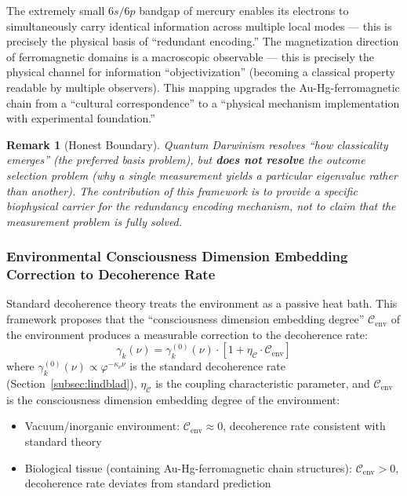 \documentclass[12pt,a4paper,twocolumn]{article}
\renewcommand{\phi}{\varphi}
\newtheorem{remark}[theorem]{Remark}
\begin{document}
The extremely small $6s/6p$ bandgap of mercury enables its electrons to simultaneously carry identical information across multiple local modes --- this is precisely the physical basis of ``redundant encoding.'' The magnetization direction of ferromagnetic domains is a macroscopic observable --- this is precisely the physical channel for information ``objectivization'' (becoming a classical property readable by multiple observers). This mapping upgrades the Au-Hg-ferromagnetic chain from a ``cultural correspondence'' to a ``physical mechanism implementation with experimental foundation.''

\begin{remark}[Honest Boundary]
Quantum Darwinism resolves ``how classicality emerges'' (the preferred basis problem), but \textbf{does not resolve} the outcome selection problem (why a single measurement yields a particular eigenvalue rather than another). The contribution of this framework is to provide a specific biophysical carrier for the redundancy encoding mechanism, not to claim that the measurement problem is fully solved.
\end{remark}

\subsubsection{Environmental Consciousness Dimension Embedding Correction to Decoherence Rate}
\label{subsec:env_C_correction}

Standard decoherence theory treats the environment as a passive heat bath. This framework proposes that the ``consciousness dimension embedding degree'' $\mathcal{C}_{\text{env}}$ of the environment produces a measurable correction to the decoherence rate:
\begin{equation}
\gamma_k(\nu) = \gamma_k^{(0)}(\nu)\cdot\left[1 + \eta_\mathcal{C}\cdot\mathcal{C}_{\text{env}}\right]
\label{eq:env_C_correction}
\end{equation}
where $\gamma_k^{(0)}(\nu) \propto \phi^{-\kappa_\nu\nu}$ is the standard decoherence rate (Section~\ref{subsec:lindblad}), $\eta_\mathcal{C}$ is the coupling characteristic parameter, and $\mathcal{C}_{\text{env}}$ is the consciousness dimension embedding degree of the environment:
\begin{itemize}
\item Vacuum/inorganic environment: $\mathcal{C}_{\text{env}} \approx 0$, decoherence rate consistent with standard theory
\item Biological tissue (containing Au-Hg-ferromagnetic chain structures): $\mathcal{C}_{\text{env}} > 0$, decoherence rate deviates from standard prediction
\end{itemize}
\end{document}
